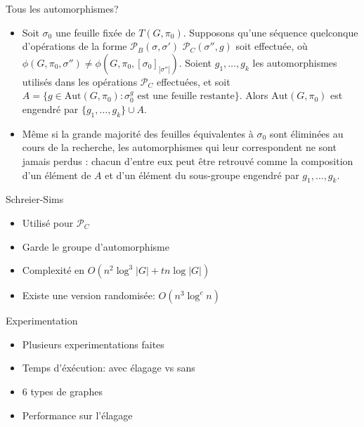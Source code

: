 \documentclass[11pt]{beamer}
\begin{document}
\begin{frame}{Tous les automorphismes?}
\begin{itemize}
    \item Soit $\sigma_0$ une feuille fixée de $T(G, \pi_0)$. Supposons qu'une séquence quelconque d'opérations de la forme $\mathcal{P}_B(\sigma, \sigma')$ $\mathcal{P}_C(\sigma'', g)$ soit effectuée, où $\phi(G,\pi_0,\sigma'') \neq \phi(G,\pi_0,[\sigma_0]_{|\sigma''|})$. Soient $g_1, \ldots, g_k$ les automorphismes utilisés dans les opérations $\mathcal{P}_C$ effectuées, et soit $A = \{g \in \mathrm{Aut}(G,\pi_0) : \sigma_0^g \text{ est une feuille restante}\}$. Alors $\mathrm{Aut}(G,\pi_0)$ est engendré par $\{g_1, \ldots, g_k\} \cup A$.

    \item Même si la grande majorité des feuilles équivalentes à $\sigma_0$ sont éliminées au cours de la recherche, les automorphismes qui leur correspondent ne sont jamais perdus : chacun d'entre eux peut être retrouvé comme la composition d'un élément de $A$ et d'un élément du sous-groupe engendré par $g_1,\ldots,g_k$.

\end{itemize} 
\end{frame}
\begin{frame}{Schreier-Sims}

    \begin{itemize}
        \item Utilisé pour $\mathcal{P}_C$
        \item Garde le groupe d'automorphisme
        \item Complexité en $O(n^2 \log^3 |G| + tn \log |G|)$
        \item Existe une version randomisée:  $O(n^3 \log^c n)$
    \end{itemize}
        
    \end{frame}



\begin{frame}{Experimentation}

\begin{itemize}
    \item Plusieurs experimentations faites
    \item Temps d'éxécution: avec élagage vs sans
    \item 6 types de graphes
    \item Performance sur l'élagage
\end{itemize}
    
\end{frame}
\end{document}
